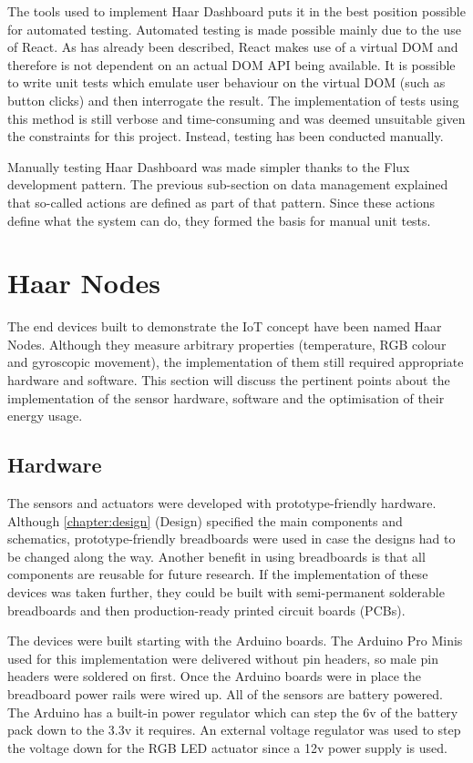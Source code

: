       The tools used to implement Haar Dashboard puts it in the best position possible for automated testing. Automated testing is made possible mainly due to the use of React. As has already been described, React makes use of a virtual DOM and therefore is not dependent on an actual DOM API being available. It is possible to write unit tests which emulate user behaviour on the virtual DOM (such as button clicks) and then interrogate the result. The implementation of tests using this method is still verbose and time-consuming and was deemed unsuitable given the constraints for this project. Instead, testing has been conducted manually.

      Manually testing Haar Dashboard was made simpler thanks to the Flux development pattern. The previous sub-section on data management explained that so-called actions are defined as part of that pattern. Since these actions define what the system can do, they formed the basis for manual unit tests.

  \section{Haar Nodes}
    The end devices built to demonstrate the IoT concept have been named Haar Nodes. Although they measure arbitrary properties (temperature, RGB colour and gyroscopic movement), the implementation of them still required appropriate hardware and software. This section will discuss the pertinent points about the implementation of the sensor hardware, software and the optimisation of their energy usage.

    \subsection{Hardware}
      The sensors and actuators were developed with prototype-friendly hardware. Although \ref{chapter:design} (Design) specified the main components and schematics, prototype-friendly breadboards were used in case the designs had to be changed along the way. Another benefit in using breadboards is that all components are reusable for future research. If the implementation of these devices was taken further, they could be built with semi-permanent solderable breadboards and then production-ready printed circuit boards (PCBs).

      The devices were built starting with the Arduino boards. The Arduino Pro Minis used for this implementation were delivered without pin headers, so male pin headers were soldered on first. Once the Arduino boards were in place the breadboard power rails were wired up. All of the sensors are battery powered. The Arduino has a built-in power regulator which can step the 6v of the battery pack down to the 3.3v it requires. An external voltage regulator was used to step the voltage down for the RGB LED actuator since a 12v power supply is used.

